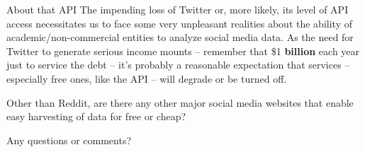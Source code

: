 \documentclass{beamer}
\begin{document}
\begin{frame}{About that API}
	The impending loss of Twitter or, more likely, its level of API access necessitates us to face some very unpleasant realities about the ability of academic/non-commercial entities to analyze social media data. As the need for Twitter to generate serious income mounts -- remember that \$1 \textbf{billion} each year just to service the debt -- it's probably a reasonable expectation that services -- especially free ones, like the API -- will degrade or be turned off.
	\newline
	
	Other than Reddit, are there any other major social media websites that enable easy harvesting of data for free or cheap?
\end{frame}

\begin{frame}
	Any questions or comments?
\end{frame}
\end{document}
